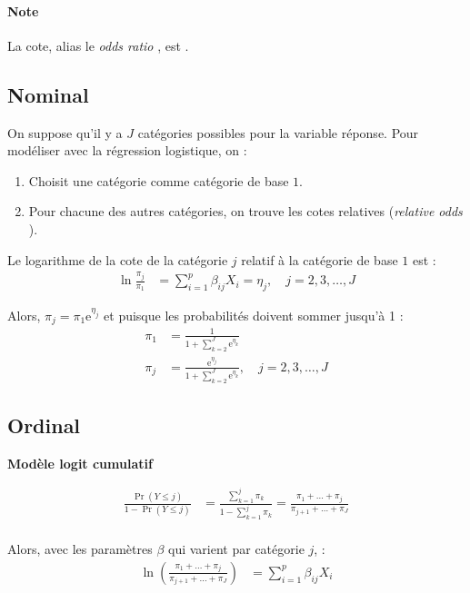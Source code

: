 \documentclass[10pt, french]{article}
\begin{document}
\begin{multicols*}{2}
\paragraph{Note}	La cote, alias le \og \textit{odds ratio} \fg{}, est .


\subsection{Nominal}
On suppose qu'il y a $J$ catégories possibles pour la variable réponse. 
Pour modéliser avec la régression logistique, on :
\begin{enumerate}[label	=	\circled{\arabic*}{lightgray}]
	\item	Choisit une catégorie comme catégorie de base $1$.
	\item	Pour chacune des autres catégories, on trouve les cotes relatives (\og \textit{relative odds} \fg{}).
\end{enumerate}

Le logarithme de la cote de la catégorie $j$ relatif à la catégorie de base $1$ est :
\begin{align*}
	\ln \frac{\pi_{j}}{\pi_{1}}
	&=	\sum_{i	=	1}^{p} \beta_{ij} X_{i}
	=	\eta_{j}, \quad j	=	2, 3, \dots, J
\end{align*}

Alors, $\pi_{j}	=	\pi_{1}\textrm{e}^{\eta_{j}}$ et puisque les probabilités doivent sommer jusqu'à 1 :
\begin{align*}
	\pi_{1}
	&=	\frac{1}{1 + \sum_{k	=	2}^{J} \textrm{e}^{\eta_{k}}}	\\
	\pi_{j}
	&=	\frac{\textrm{e}^{\eta_{j}}}{1 + \sum_{k	=	2}^{J} \textrm{e}^{\eta_{k}}}, \quad j	=	2, 3, \dots, J
\end{align*}


\subsection{Ordinal}
\textbf{Modèle logit cumulatif}

\begin{align*}
	\frac{\Pr(Y \leq j)}{1	-	\Pr(Y \leq j)}
	&=	\frac{\sum_{k	=	1}^{j} \pi_{k}}{1	-	\sum_{k	=	1}^{j} \pi_{k}}	
	=	\frac{\pi_{1} + \hdots + \pi_{j}}{\pi_{j + 1} + \hdots + \pi_{J}}	\\
\end{align*}

Alors, avec les paramètres $\beta$ qui varient par catégorie $j$, :
\begin{align*}
	\ln\left(\frac{\pi_{1} + \hdots + \pi_{j}}{\pi_{j + 1} + \hdots + \pi_{J}}\right)
	&=	\sum_{i	=	1}^{p}\beta_{ij}X_{i}	\\
\end{align*}


\end{multicols*}
\end{document}
